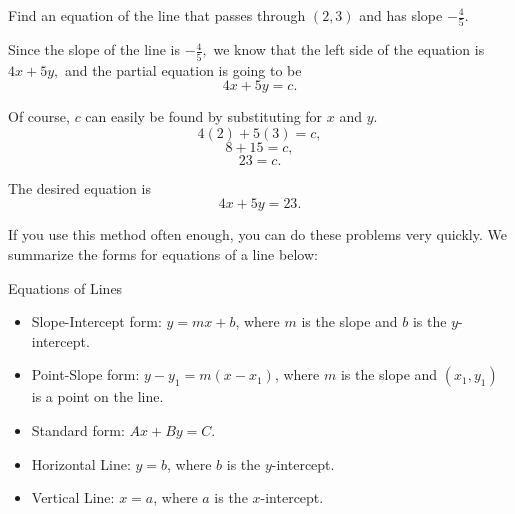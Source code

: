 \begin{example}
Find an equation of the line that passes through $(2, 3)$ and has slope $-\frac{4}{5}.$
\end{example}

\begin{solution}
Since the slope of the line is $-\frac{4}{5},$ we know that the left side of the equation is $4x + 5y,$ and the partial equation is going to be
\[4x + 5y = c.\]

Of course, $c$ can easily be found by substituting for $x$ and $y.$
\[4(2) + 5(3) = c,\]
\[8 + 15 = c,\]
\[23 = c.\]

The desired equation is
\[4x + 5y = 23.\]
\end{solution}

If you use this method often enough, you can do these problems very quickly.    
We summarize the forms for equations of a line below:
\begin{summarybox} Equations of Lines
\begin{itemize}
  \item Slope-Intercept form: $y = mx + b$, where $m$ is the slope and $b$ is the $y$-intercept.
  \item Point-Slope form: $y - y_1 = m(x - x_1)$, where $m$ is the slope and $(x_1, y_1)$ is a point on the line.
  \item Standard form: $Ax + By = C$.
  \item Horizontal Line: $y = b$, where $b$ is the $y$-intercept.
  \item Vertical Line: $x = a$, where $a$ is the $x$-intercept.
\end{itemize}
\end{summarybox}
